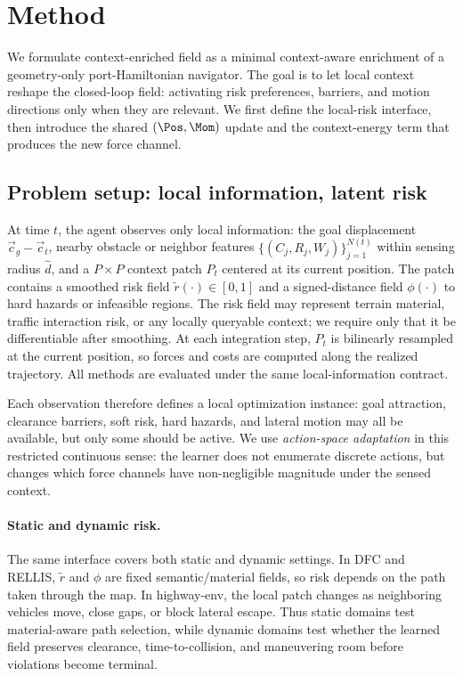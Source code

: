 \section{Method}
\label{sec:method}

We formulate context-enriched field as a minimal context-aware enrichment of a
geometry-only port-Hamiltonian navigator. The goal is to let local
context reshape the closed-loop field: activating risk preferences,
barriers, and motion directions only when they are relevant. We first
define the local-risk interface, then introduce the shared
$(\Pos,\Mom)$ update and the context-energy term that produces the new
force channel.

\subsection{Problem setup: local information, latent risk}
\label{sec:method:setup}

At time $t$, the agent observes only local information: the goal
displacement $\vec c_g-\vec c_t$, nearby obstacle or neighbor features
$\{(C_j,R_j,W_j)\}_{j=1}^{N(t)}$ within sensing radius $\hat d$, and a
$P\times P$ context patch $P_t$ centered at its current position. The
patch contains a smoothed risk field $\tilde r(\cdot)\in[0,1]$ and a
signed-distance field $\phi(\cdot)$ to hard hazards or infeasible
regions. The risk field may represent terrain material, traffic
interaction risk, or any locally queryable context; we require only that
it be differentiable after smoothing. At each integration step, $P_t$ is
bilinearly resampled at the current position, so forces and costs are
computed along the realized trajectory. All methods are evaluated under
the same local-information contract.

Each observation therefore defines a local optimization instance: goal
attraction, clearance barriers, soft risk, hard hazards, and lateral
motion may all be available, but only some should be active. We use \textit{action-space adaptation} in this restricted continuous sense: the
learner does not enumerate discrete actions, but changes which force
channels have non-negligible magnitude under the sensed context.

\paragraph{Static and dynamic risk.}
The same interface covers both static and dynamic settings. In DFC and
RELLIS, $\tilde r$ and $\phi$ are fixed semantic/material fields, so risk
depends on the path taken through the map. In highway-env, the local
patch changes as neighboring vehicles move, close gaps, or block lateral
escape. Thus static domains test material-aware path selection, while
dynamic domains test whether the learned field preserves clearance,
time-to-collision, and maneuvering room before violations become
terminal.

